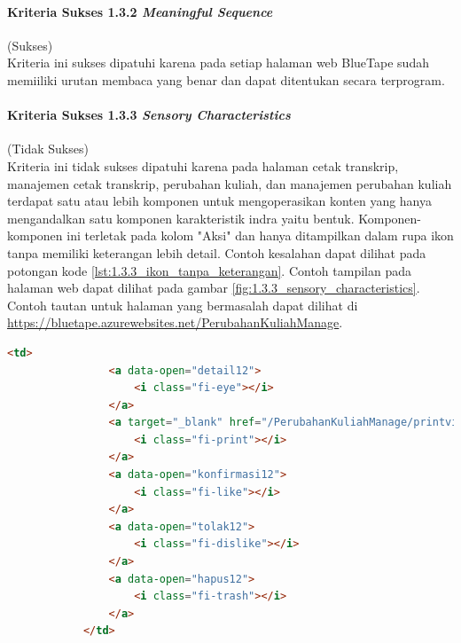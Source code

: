 \documentclass[a4paper,twoside]{article}
\begin{document}
\begin{enumerate}
		\paragraph{Kriteria Sukses 1.3.2 \textit{Meaningful Sequence}}
		\label{par:kepatuhan_bluetape_kriteria_sukses_1.3.2}
		(Sukses)\\

		Kriteria ini sukses dipatuhi karena pada setiap halaman web BlueTape sudah memiiliki urutan membaca yang benar dan dapat ditentukan secara terprogram. 

		\paragraph{Kriteria Sukses 1.3.3 \textit{Sensory Characteristics}}
		\label{par:kepatuhan_bluetape_kriteria_sukses_1.3.3}
		(Tidak Sukses)\\

		Kriteria ini tidak sukses dipatuhi karena pada halaman cetak transkrip, manajemen cetak transkrip, perubahan kuliah, dan manajemen perubahan kuliah terdapat satu atau lebih komponen untuk mengoperasikan konten yang hanya mengandalkan satu komponen karakteristik indra yaitu bentuk. Komponen-komponen ini terletak pada kolom "Aksi" dan hanya ditampilkan dalam rupa ikon tanpa memiliki keterangan lebih detail. Contoh kesalahan dapat dilihat pada potongan kode \ref{lst:1.3.3_ikon_tanpa_keterangan}. Contoh tampilan pada halaman web dapat dilihat pada gambar \ref{fig:1.3.3_sensory_characteristics}. Contoh tautan untuk halaman yang bermasalah dapat dilihat di \url{https://bluetape.azurewebsites.net/PerubahanKuliahManage}.

		\begin{lstlisting}[frame=single, label={lst:1.3.3_ikon_tanpa_keterangan}, language=HTML, caption=Kriteria Sukses 1.3.3 - Ikon Tanpa Keterangan]
			<td>
				<a data-open="detail12">
					<i class="fi-eye"></i>
				</a>
				<a target="_blank" href="/PerubahanKuliahManage/printview/12">
					<i class="fi-print"></i>
				</a>
				<a data-open="konfirmasi12">
					<i class="fi-like"></i>
				</a>  
				<a data-open="tolak12">
					<i class="fi-dislike"></i>
				</a>
				<a data-open="hapus12">
					<i class="fi-trash"></i>
				</a>
			</td>
		\end{lstlisting}


\end{enumerate}
\end{document}
